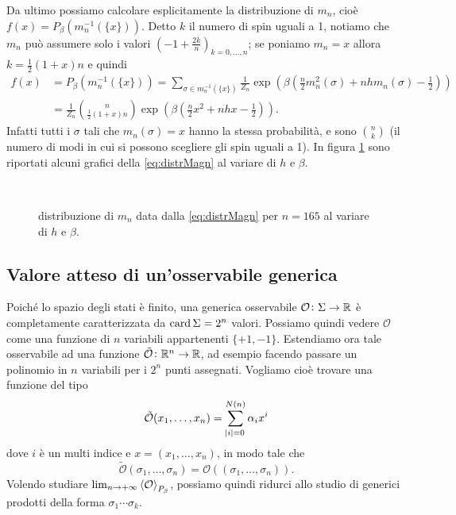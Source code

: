 Da ultimo possiamo calcolare esplicitamente la distribuzione di $ m_n $, cioè $ f(x) = P_\beta \left( m_n^{-1} (\{x\}) \right) $. Detto $ k $ il numero di spin uguali a 1, notiamo che $ m_n $ può assumere solo i valori $ \left(-1 + \frac{2k}{n}\right)_{k=0,\ldots,n} $; se poniamo $ m_n = x $ allora $ k = \frac{1}{2}(1+x) n $ e quindi
\begin{align}\label{eq:distrMagn}
    f(x) & = P_\beta \left( m_n^{-1} (\{x\}) \right) = \sum_{\sigma\in m_n^{-1}(\{x\})} \frac{1}{Z_n} \exp\left( \beta\left( \frac{n}{2}m_n^2(\sigma) + nhm_n(\sigma) -\frac{1}{2}\right) \right) \nonumber \\
    & = \frac{1}{Z_n} \binom{n}{\frac{1}{2}(1+x) n} \exp\left( \beta\left( \frac{n}{2}x^2 + nhx - \frac{1}{2} \right) \right).
\end{align}
Infatti tutti i $ \sigma $ tali che $ m_n(\sigma) = x $ hanno la stessa probabilità, e sono $ \binom{n}{k} $ (il numero di modi in cui si possono scegliere gli spin uguali a 1). In figura \ref{fig:distrMagn} sono riportati alcuni grafici della \eqref{eq:distrMagn} al variare di $ h $ e $ \beta $.

\iffigureon
\begin{figure}[p]
    \centering
    \subfloat[$ h=0, \beta=1 $.]{}
    \subfloat[$ h=0, \beta<1 $.]{} \\
    \subfloat[$ h=0, \beta>1 $: si ha magnetizzazione spontanea.]{}
    \caption{distribuzione di $ m_n $ data dalla \eqref{eq:distrMagn} per $ n = 165 $ al variare di $ h $ e $ \beta $.}
    \label{fig:distrMagn}
\end{figure}
\fi

\subsection{Valore atteso di un'osservabile generica}
Poiché lo spazio degli stati è finito, una generica osservabile $ \mathcal{O}\colon \Sigma\to\mathbb{R} $ è completamente caratterizzata da $ \operatorname{card}{\Sigma} = 2^n $ valori. Possiamo quindi vedere $ \mathcal{O} $ come una funzione di $ n $ variabili appartenenti $ \{+1,-1\} $. Estendiamo ora tale osservabile ad una funzione $ \tilde{\mathcal{O}}\colon\mathbb{R}^n\to\mathbb{R} $, ad esempio facendo passare un polinomio in $ n $ variabili per i $ 2^n $ punti assegnati. Vogliamo cioè trovare una funzione del tipo
\[ \tilde{\mathcal{O}} (x_1,\ldots,x_n) = \sum_{\abs{i}=0}^{N(n)} \alpha_{i} x^i \]
dove $ i $ è un multi indice e $ x = (x_1, \ldots, x_n) $, in modo tale che
\[ \tilde{\mathcal{O}}(\sigma_1, \ldots, \sigma_n) = \mathcal{O}((\sigma_1,\ldots,\sigma_n)). \]
Volendo studiare $ \lim_{n \to +\infty} \left< \mathcal{O} \right>_{P_\beta} $, possiamo quindi ridurci allo studio di generici prodotti della forma $ \sigma_1 \cdots \sigma_k $.

